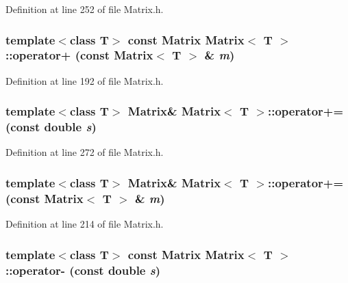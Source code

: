 Definition at line 252 of file Matrix.h.

\hypertarget{classMatrix_a311f3649e41cb4a3155f3f71a65829cb}{
\subsubsection[{operator+}]{\setlength{\rightskip}{0pt plus 5cm}template$<$class T$>$ const {\bf Matrix} {\bf Matrix}$<$ T $>$::operator+ (const {\bf Matrix}$<$ T $>$ \& {\em m})}}
\label{classMatrix_a311f3649e41cb4a3155f3f71a65829cb}


Definition at line 192 of file Matrix.h.

\hypertarget{classMatrix_a54d2f788e4e209cfe472bbcbbbd6bc2d}{
\subsubsection[{operator+=}]{\setlength{\rightskip}{0pt plus 5cm}template$<$class T$>$ {\bf Matrix}\& {\bf Matrix}$<$ T $>$::operator+= (const double {\em s})}}
\label{classMatrix_a54d2f788e4e209cfe472bbcbbbd6bc2d}


Definition at line 272 of file Matrix.h.

\hypertarget{classMatrix_a480a72298ae1fc8443b0edfaa66d7c46}{
\subsubsection[{operator+=}]{\setlength{\rightskip}{0pt plus 5cm}template$<$class T$>$ {\bf Matrix}\& {\bf Matrix}$<$ T $>$::operator+= (const {\bf Matrix}$<$ T $>$ \& {\em m})}}
\label{classMatrix_a480a72298ae1fc8443b0edfaa66d7c46}


Definition at line 214 of file Matrix.h.

\hypertarget{classMatrix_a254817e151d338279aec5711b6cdf403}{
\subsubsection[{operator-\/}]{\setlength{\rightskip}{0pt plus 5cm}template$<$class T$>$ const {\bf Matrix} {\bf Matrix}$<$ T $>$::operator-\/ (const double {\em s})}}
\label{classMatrix_a254817e151d338279aec5711b6cdf403}


